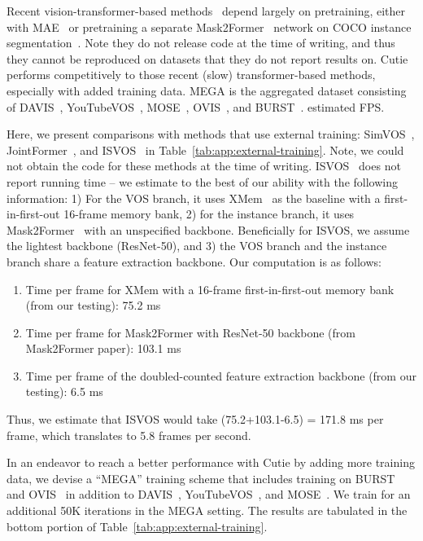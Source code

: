 \begin{table}
{    Recent vision-transformer-based methods~\cite{wang2022look,wu2023scalable,zhang2023joint} depend largely on pretraining, either with MAE~\cite{he2021masked} or pretraining a separate Mask2Former~\cite{cheng2022masked} network on COCO instance segmentation~\cite{lin2014microsoft}.
    Note they do not release code at the time of writing, and thus they cannot be reproduced on datasets that they do not report results on. 
    Cutie performs competitively to those recent (slow) transformer-based methods, especially with added training data.
    MEGA is the aggregated dataset consisting of DAVIS~\cite{perazzi2016benchmark}, YouTubeVOS~\cite{xu2018youtubeVOS}, MOSE~\cite{ding2023mose}, OVIS~\cite{qi2022occluded}, and BURST~\cite{athar2023burst}.
    estimated FPS.}
    \label{tab:app:external-training}
\end{table}

Here, we present comparisons with methods that use external training: SimVOS~\cite{shi2015hierarchicalECSSD}, JointFormer~\cite{zhang2023joint}, and ISVOS~\cite{wang2022look} in Table~\ref{tab:app:external-training}. 
Note, we could not obtain the code for these methods at the time of writing. 
ISVOS~\cite{wang2022look} does not report running time -- we estimate to the best of our ability with the following information: 
1) For the VOS branch, it uses XMem~\cite{cheng2022xmem} as the baseline with a first-in-first-out 16-frame memory bank, 
2) for the instance branch, it uses Mask2Former~\cite{cheng2022masked} with an unspecified backbone. Beneficially for ISVOS, we assume the lightest backbone (ResNet-50), and 
3) the VOS branch and the instance branch share a feature extraction backbone.
Our computation is as follows:
\begin{enumerate}
    \item Time per frame for XMem with a 16-frame first-in-first-out memory bank (from our testing): 75.2 ms
    \item Time per frame for Mask2Former with ResNet-50 backbone (from Mask2Former paper): 103.1 ms
    \item Time per frame of the doubled-counted feature extraction backbone (from our testing): 6.5 ms
\end{enumerate}
Thus, we estimate that ISVOS would take (75.2+103.1-6.5) = 171.8 ms per frame, which translates to 5.8 frames per second.

In an endeavor to reach a better performance with Cutie by adding more training data, we devise a ``MEGA'' training scheme that includes training on BURST~\cite{athar2023burst} and OVIS~\cite{qi2022occluded} in addition to DAVIS~\cite{perazzi2016benchmark}, YouTubeVOS~\cite{xu2018youtubeVOS}, and MOSE~\cite{ding2023mose}. 
We train for an additional 50K iterations in the MEGA setting.
The results are tabulated in the bottom portion of Table~\ref{tab:app:external-training}. 

